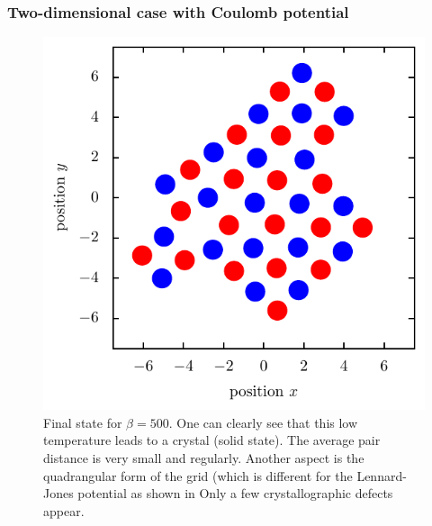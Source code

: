 \documentclass[11pt, a4paper]{article}
\numberwithin{equation}{section}
\begin{document}
\subsubsection{Two-dimensional case with Coulomb potential}
\begin{figure}[!h]
\centering
\includegraphics[scale=1]{figures/Kristall_3_beta_500.pdf}
\caption{Final state for $\beta = 500$. 
One can clearly see that this low temperature leads to a crystal (solid state). 
The average pair distance is very small and regularly.
Another aspect is the quadrangular form of the grid (which is different for the Lennard-Jones potential as shown in 
Only a few crystallographic defects appear.}
\end{figure}
\end{document}

